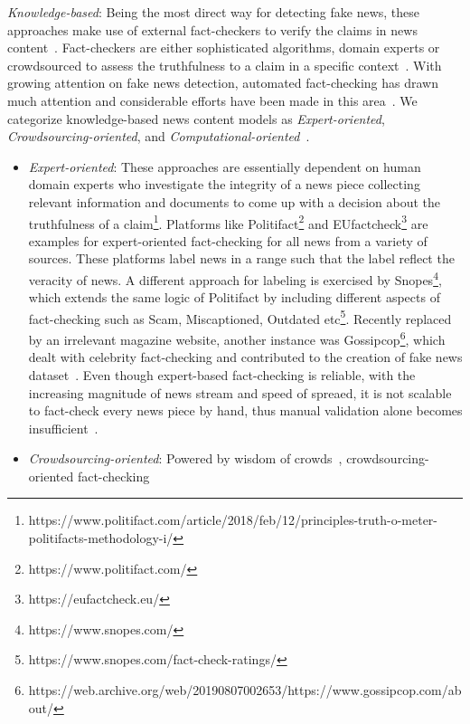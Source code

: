 \begin{description}
    \item{\emph{Knowledge-based}}: Being the most direct way for detecting fake news, these approaches make use of external fact-checkers to verify the claims in news content~\parencite{FakeNewsDetectionOnSocialMediaADataMiningPerspective_Shu}. Fact-checkers are either sophisticated algorithms, domain experts or crowdsourced to assess the truthfulness to a claim in a specific context~\parencite{FactChecking_Vlachos}. With growing attention on fake news detection, automated fact-checking has drawn much attention and considerable efforts have been made in this area~\parencite{AutomatedFactChecking_Thorne, OverviewOfCheckThat_Barroncede}. We categorize knowledge-based news content models as \emph{Expert-oriented}, \emph{Crowdsourcing-oriented}, and \emph{Computational-oriented}~\parencite{FakeNewsDetectionOnSocialMediaADataMiningPerspective_Shu}.
    \begin{itemize}
        \item \emph{Expert-oriented}: These approaches are essentially dependent on human domain experts who investigate the integrity of a
              news piece collecting relevant information and documents to come up with a decision about the truthfulness of a
              claim\footnote{https://www.politifact.com/article/2018/feb/12/principles-truth-o-meter-politifacts-methodology-i/}. Platforms
              like Politifact\footnote{https://www.politifact.com/} and EUfactcheck\footnote{https://eufactcheck.eu/} are examples for expert-oriented fact-checking for all news from a variety of sources. These platforms label news in a range such that the label reflect the veracity of news. A different approach for labeling is exercised by Snopes\footnote{https://www.snopes.com/}, which extends the same logic of Politifact by including different aspects of fact-checking such as Scam, Miscaptioned, Outdated
              etc\footnote{https://www.snopes.com/fact-check-ratings/}. Recently replaced by an irrelevant magazine website, another instance was Gossipcop\footnote{https://web.archive.org/web/20190807002653/https://www.gossipcop.com/about/}, which dealt with celebrity fact-checking and contributed to the creation of fake news dataset~\parencite{FakeNewsNet_Shu}. Even though expert-based fact-checking is reliable, with the increasing magnitude of news stream and speed of spreaed, it is not scalable to fact-check every news piece by hand, thus manual validation alone becomes insufficient~\parencite{ASurveyOnAutomatedFactChecking_Guo}.
        \item \emph{Crowdsourcing-oriented}: Powered by wisdom of crowds~\parencite{WisdomOfCrowds_Galton}, crowdsourcing-oriented fact-checking

\end{itemize}
\end{description}
